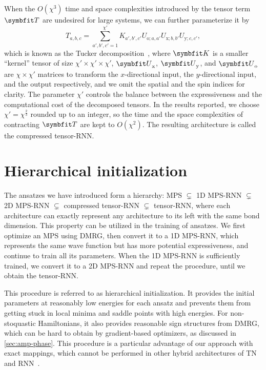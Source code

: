 When the $O(\chi^3)$ time and space complexities introduced by the tensor term $\mT$ are undesired for large systems, we can further parameterize it by
\begin{equation}
T_{a, b, c} = \sum_{a', b', c' = 1}^{\chi'} K_{a', b', c'} U_{\text{o}; a, a'}  U_{\text{x}; b, b'} U_{\text{y}; c, c'},
\label{eq:tensor-decomp}
\end{equation}
which is known as the Tucker decomposition~\cite{tucker1966some}, where $\mK$ is a smaller ``kernel'' tensor of size $\chi' \times \chi' \times \chi'$, $\mU_\text{x}$, $\mU_\text{y}$, and $\mU_\text{o}$ are $\chi \times \chi'$ matrices to transform the $x$-directional input, the $y$-directional input, and the output respectively, and we omit the spatial and the spin indices for clarity. The parameter $\chi'$ controls the balance between the expressiveness and the computational cost of the decomposed tensors. In the results reported, we choose $\chi' = \chi^\frac{2}{3}$ rounded up to an integer, so the time and the space complexities of contracting $\mT$ are kept to $O(\chi^2)$. The resulting architecture is called the compressed tensor-RNN.

\section{Hierarchical initialization}

The ansatzes we have introduced form a hierarchy: MPS $\subsetneq$ 1D MPS-RNN $\subsetneq$ 2D MPS-RNN $\subsetneq$ compressed tensor-RNN $\subsetneq$ tensor-RNN, where each architecture can exactly represent any architecture to its left with the same bond dimension. This property can be utilized in the training of ansatzes. We first optimize an MPS using DMRG, then convert it to a 1D MPS-RNN, which represents the same wave function but has more potential expressiveness, and continue to train all its parameters. When the 1D MPS-RNN is sufficiently trained, we convert it to a 2D MPS-RNN and repeat the procedure, until we obtain the tensor-RNN.

This procedure is referred to as hierarchical initialization. It provides the initial parameters at reasonably low energies for each ansatz and prevents them from getting stuck in local minima and saddle points with high energies. For non-stoquastic Hamiltonians, it also provides reasonable sign structures from DMRG, which can be hard to obtain by gradient-based optimizers, as discussed in \cref{sec:amp-phase}. This procedure is a particular advantage of our approach with exact mappings, which cannot be performed in other hybrid architectures of TN and RNN~\cite{hibat2021variational, hibat2022supplementing, chen2023antn}.

